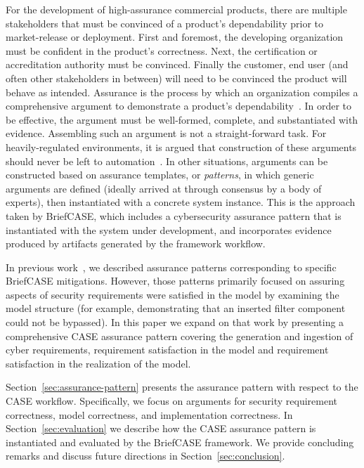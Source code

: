 For the development of high-assurance commercial products, there are multiple stakeholders that must be convinced of a product's dependability prior to market-release or deployment.  First and foremost, the developing organization must be confident in the product's correctness.  Next, the certification or accreditation authority must be convinced.  Finally the customer, end user (and often other stakeholders in between) will need to be convinced the product will behave as intended.  Assurance is the process by which an organization compiles a comprehensive argument to demonstrate a product's dependability~\cite{???}.  In order to be effective, the argument must be well-formed, complete, and substantiated with evidence.  Assembling such an argument is not a straight-forward task.  For heavily-regulated environments, it is argued that construction of these arguments should never be left to automation~\cite{???-Holloway}.  In other situations, arguments can be constructed based on assurance templates, or \textit{patterns}, in which generic arguments are defined (ideally arrived at through consensus by a body of experts), then instantiated with a concrete system instance.  This is the approach taken by BriefCASE, which includes a cybersecurity assurance pattern that is instantiated with the system under development, and incorporates evidence produced by artifacts generated by the framework workflow.


In previous work~\cite{resolute-destion}, we described assurance patterns corresponding to specific BriefCASE mitigations.  However, those patterns primarily focused on assuring aspects of security requirements were satisfied in the model by examining the model structure (for example, demonstrating that an inserted filter component could not be bypassed).  
%
In this paper we expand on that work by presenting a comprehensive CASE assurance pattern covering the generation and ingestion of cyber requirements, requirement satisfaction in the model and requirement satisfaction in the realization of the model.  

Section~\ref{sec:assurance-pattern} presents the assurance pattern with respect to the CASE workflow. Specifically, we focus on arguments for security requirement correctness, model correctness, and implementation correctness.  In Section~\ref{sec:evaluation} we describe how the CASE assurance pattern is instantiated and evaluated by the BriefCASE framework.  We provide concluding remarks and discuss future directions in Section~\ref{sec:conclusion}.